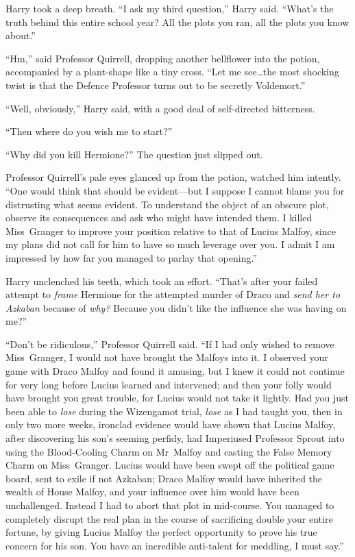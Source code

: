 Harry took a deep breath. “I ask my third question,” Harry said. “What’s the truth behind this entire school year? All the plots you ran, all the plots you know about.”

“Hm,” said Professor Quirrell, dropping another bellflower into the potion, accompanied by a plant-shape like a tiny cross. “Let me see…the most shocking twist is that the Defence Professor turns out to be secretly Voldemort.”

“Well, obviously,” Harry said, with a good deal of self-directed bitterness.

“Then where do you wish me to start?”

“Why did you kill Hermione?” The question just slipped out.

Professor Quirrell’s pale eyes glanced up from the potion, watched him intently. “One would think that should be evident—but I suppose I cannot blame you for distrusting what seems evident. To understand the object of an obscure plot, observe its consequences and ask who might have intended them. I killed Miss~Granger to improve your position relative to that of Lucius Malfoy, since my plans did not call for him to have so much leverage over you. I admit I am impressed by how far you managed to parlay that opening.”

Harry unclenched his teeth, which took an effort. “That’s after your failed attempt to \emph{frame} Hermione for the attempted murder of Draco and \emph{send her to Azkaban} because of \emph{why?} Because you didn’t like the influence she was having on me?”

“Don’t be ridiculous,” Professor Quirrell said. “If I had only wished to remove Miss~Granger, I would not have brought the Malfoys into it. I observed your game with Draco Malfoy and found it amusing, but I knew it could not continue for very long before Lucius learned and intervened; and then your folly would have brought you great trouble, for Lucius would not take it lightly. Had you just been able to \emph{lose} during the Wizengamot trial, \emph{lose} as I had taught you, then in only two more weeks, ironclad evidence would have shown that Lucius Malfoy, after discovering his son’s seeming perfidy, had Imperiused Professor Sprout into using the Blood-Cooling Charm on Mr~Malfoy and casting the False Memory Charm on Miss~Granger. Lucius would have been swept off the political game board, sent to exile if not Azkaban; Draco Malfoy would have inherited the wealth of House Malfoy, and your influence over him would have been unchallenged. Instead I had to abort that plot in mid-course. You managed to completely disrupt the real plan in the course of sacrificing double your entire fortune, by giving Lucius Malfoy the perfect opportunity to prove his true concern for his son. You have an incredible anti-talent for meddling, I must say.”

